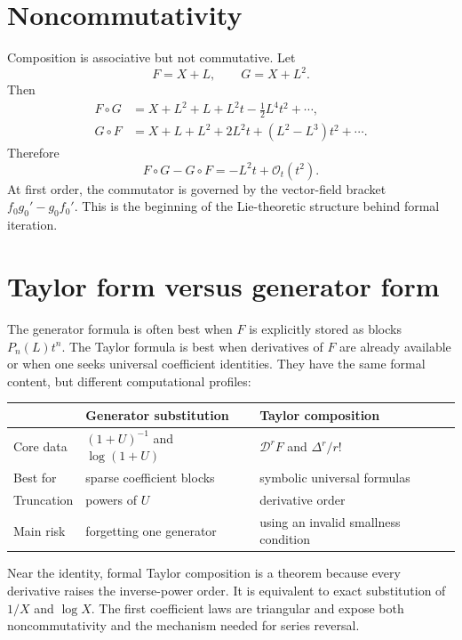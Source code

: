 \documentclass[11pt,oneside]{book}
\theoremstyle{definition}
\theoremstyle{remark}
\newcommand{\D}{\mathcal D}
\newcommand{\bigO}{\mathcal O}
\newcommand{\compose}{\mathbin{\circ}}
\begin{document}
\section{Noncommutativity}
Composition is associative but not commutative.  Let
\[
 F=X+L,
 \qquad
 G=X+L^2.
\]
Then
\begin{align*}
 F\compose G
 &=X+L^2+L+L^2t-\frac12L^4t^2+\cdots,\\
 G\compose F
 &=X+L+L^2+2L^2t+(L^2-L^3)t^2+\cdots.
\end{align*}
Therefore
\begin{equation}\label{eq:composition-noncommutative}
 F\compose G-G\compose F=-L^2t+\bigO_t(t^2).
\end{equation}
At first order, the commutator is governed by the vector-field bracket
$f_0g_0'-g_0f_0'$.  This is the beginning of the Lie-theoretic structure
behind formal iteration.

\section{Taylor form versus generator form}
The generator formula is often best when $F$ is explicitly stored as blocks
$P_n(L)t^n$.  The Taylor formula is best when derivatives of $F$ are already
available or when one seeks universal coefficient identities.  They have the
same formal content, but different computational profiles:
\begin{center}
\begin{tabularx}{0.94\textwidth}{@{}lXX@{}}
\toprule
 & Generator substitution & Taylor composition \\
\midrule
Core data & $(1+U)^{-1}$ and $\log(1+U)$ & $\D^rF$ and $\Delta^r/r!$ \\
Best for & sparse coefficient blocks & symbolic universal formulas \\
Truncation & powers of $U$ & derivative order \\
Main risk & forgetting one generator & using an invalid smallness condition \\
\bottomrule
\end{tabularx}
\end{center}

\begin{summarybox}
Near the identity, formal Taylor composition is a theorem because every
derivative raises the inverse-power order.  It is equivalent to exact
substitution of $1/X$ and $\log X$.  The first coefficient laws are triangular
and expose both noncommutativity and the mechanism needed for series reversal.
\end{summarybox}
\end{document}
